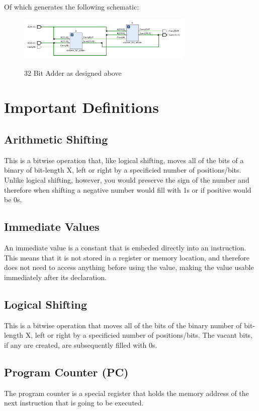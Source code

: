 Of which generates the following schematic:
\begin{figure}[!htbp]
    \centering
    \caption{32 Bit Adder as designed above}
    \includegraphics[width=0.75\textwidth]{pictures/part1/thirtytwo_bit_adder.png}
    \label{32 Bit Adder}
\end{figure}



\newpage
\section{Important Definitions}

\subsection{Arithmetic Shifting}
\qquad
This is a bitwise operation that, like logical shifting, moves all of the bits of a binary of bit-length X, left or right by a specificied number of positions/bits. Unlike logical shifting, however, you would preserve the sign of the number and therefore when shifting a negative number would fill with 1s or if positive would be 0s.

\subsection{Immediate Values}
\qquad
An immediate value is a constant that is embeded directly into an instruction. This means that it is not stored in a register or memory location, and therefore does not need to access anything before using the value, making the value usable immediately after its declaration.

\subsection{Logical Shifting}
\qquad
This is a bitwise operation that moves all of the bits of the binary number of bit-length X, left or right by a specificied number of positions/bits. The vacant bits, if any are created, are subsequently filled with 0s.

\subsection{Program Counter (PC)}
\qquad
The program counter is a special register that holds the memory address of the next instruction that is going to be executed.

